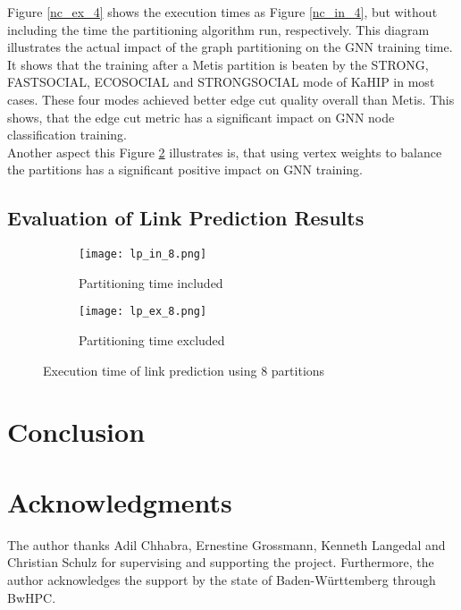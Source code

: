 \documentclass[acmsmall,nonacm,screen,review]{acmart}
\begin{document}
Figure \ref{nc_ex_4} shows the execution times as Figure \ref{nc_in_4}, but without including the time the partitioning algorithm run, respectively. This diagram illustrates the actual impact of the graph partitioning on the GNN training time. It shows that the training after a Metis partition is beaten by the STRONG, FASTSOCIAL, ECOSOCIAL and STRONGSOCIAL mode of KaHIP in most cases. These four modes achieved better edge cut quality overall than Metis. This shows, that the edge cut metric has a significant impact on GNN node classification training.\\
Another aspect this Figure \ref{lp_ex_4} illustrates is, that using vertex weights to balance the partitions has a significant positive impact on GNN training. 
\subsection{Evaluation of Link Prediction Results}
\begin{figure}[bt!]
     \centering
     \begin{subfigure}[b]{0.45\textwidth}
         \centering
         \texttt{[image: lp\_in\_8.png]}
         \caption{Partitioning time included}
         \label{lp_in_4}
     \end{subfigure}
     \hfill
     \begin{subfigure}[b]{0.45\textwidth}
         \centering
         \texttt{[image: lp\_ex\_8.png]}
         \caption{Partitioning time excluded}
         \label{lp_ex_4}
     \end{subfigure}
     \caption{Execution time of link prediction using 8 partitions}
     \label{lp_results}
\end{figure}
\section{Conclusion}
\section{Acknowledgments}
The author thanks Adil Chhabra, Ernestine Grossmann, Kenneth Langedal and Christian Schulz for supervising and supporting the project. Furthermore, the author acknowledges the support by the state of Baden-Württemberg through BwHPC.


\end{document}

